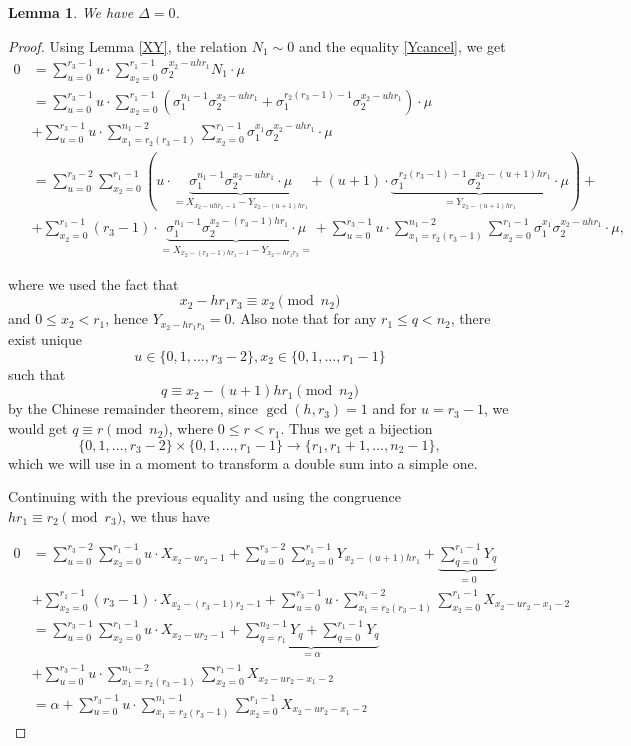 \documentclass[12pt,a4paper]{article}
\newtheorem{lemma}[theorem]{Lemma}
\theoremstyle{definition}
\begin{document}
\begin{lemma}
We have $\Delta=0$.
\end{lemma}
\begin{proof}
Using Lemma \ref{XY}, the relation $N_1\sim 0$ and the equality \eqref{Ycancel},
we get
\begin{align*}
0&= \sum_{u=0}^{r_3-1}u\cdot \sum _{x_2=0}^{r_1-1}\sigma_2^{x_2-uh r_1}N_1\cdot \mu\\
&=\sum_{u=0}^{r_3-1}u\cdot \sum _{x_2=0}^{r_1-1} \left( \sigma_1^{n_1-1}\sigma_2^{x_2-uh r_1}+\sigma_1^{r_2(r_3-1)-1}\sigma_2^{x_2-uh r_1}\right)\cdot \mu\\
&+\sum_{u=0}^{r_3-1}u\cdot \sum_{x_1=r_2(r_3-1)}^{n_1-2}\sum _{x_2=0}^{r_1-1}\sigma_1^{x_1}\sigma_2^{x_2-uh r_1}\cdot \mu\\
&=\sum_{u=0}^{r_3-2} \sum _{x_2=0}^{r_1-1} \left( u\cdot\underbrace{\sigma_1^{n_1-1}\sigma_2^{x_2-uh r_1}\cdot \mu}_{=X_{x_2-uhr_1-1}-Y_{x_2-(u+1)hr_1}}+(u+1)\cdot\underbrace{\sigma_1^{r_2(r_3-1)-1}\sigma_2^{x_2-(u+1)h r_1}\cdot \mu}_{=Y_{x_2-(u+1)h r_1}}\right)+\\
&+\sum_{x_2=0}^{r_1-1}(r_3-1)\cdot \underbrace{\sigma_1^{n_1-1}\sigma_2^{x_2-(r_3-1)h r_1}\cdot \mu}_{=
X_{x_2-(r_3-1)hr_1-1}-Y_{x_2-hr_1r_3}=
}+\sum_{u=0}^{r_3-1}u\cdot \sum_{x_1=r_2(r_3-1)}^{n_1-2}\sum _{x_2=0}^{r_1-1}\sigma_1^{x_1}\sigma_2^{x_2-uh r_1}\cdot \mu,
\end{align*}

where we used the fact that $$x_2-hr_1r_3\equiv x_2\pmod{n_2}$$  and $0\leq x_2< r_1$, hence $Y_{x_2-hr_1r_3}=0$. Also note that for any $r_1\leq q<n_2$, there exist unique $$u\in\{0,1,\dots,r_3-2\},x_2\in\{0,1,\dots,r_1-1\}$$ such that $$q\equiv x_2-(u+1)hr_1 \pmod{n_2}$$ by the Chinese remainder theorem, since $\gcd(h,r_3)=1$ and for $u=r_3-1$, we would get  $q\equiv r\pmod{n_2}$, where $0\leq r<r_1$. Thus we get a bijection $$\{0,1,\dots,r_3-2\}\times\{0,1,\dots,r_1-1\}\to \{r_1,r_1+1,\dots,n_2-1\},$$ which we will use in a moment to transform a double sum into a simple one.

Continuing with the previous equality and using the congruence $hr_1\equiv r_2\pmod{r_3}$, we thus have

\begin{align*}
0&=\sum_{u=0}^{r_3-2} \sum _{x_2=0}^{r_1-1} u\cdot X_{x_2-ur_2-1}+\sum_{u=0}^{r_3-2} \sum _{x_2=0}^{r_1-1} Y_{x_2-(u+1)hr_1}+\underbrace{\sum_{q=0}^{r_1-1}Y_{q}}_{=0}\\
&+\sum_{x_2=0}^{r_1-1}(r_3-1)\cdot X_{x_2-(r_3-1)r_2-1}+\sum_{u=0}^{r_3-1}u\cdot \sum_{x_1=r_2(r_3-1)}^{n_1-2}\sum _{x_2=0}^{r_1-1}X_{x_2-ur_2-x_1-2}\\
&=\sum_{u=0}^{r_3-1} \sum _{x_2=0}^{r_1-1} u\cdot X_{x_2-ur_2-1}+\underbrace{\sum_{q=r_1}^{n_2-1} Y_{q}+\sum_{q=0}^{r_1-1}Y_{q}}_{=\alpha}\\
&+\sum_{u=0}^{r_3-1}u\cdot \sum_{x_1=r_2(r_3-1)}^{n_1-2}\sum _{x_2=0}^{r_1-1}X_{x_2-ur_2-x_1-2}\\
&=\alpha+\sum_{u=0}^{r_3-1}u\cdot \sum_{x_1=r_2(r_3-1)}^{n_1-1}\sum _{x_2=0}^{r_1-1}X_{x_2-ur_2-x_1-2}
\end{align*}


\end{proof}
\end{document}
